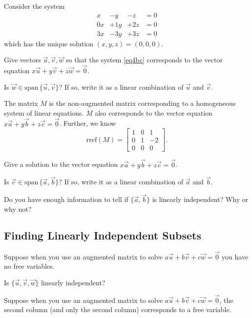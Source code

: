\documentclass[14pt]{problemset}
\newcommand{\Span}{\mathrm{span}\,}
\newcommand{\rref}{\mathrm{rref}}
\newcommand{\mat}[1]{\begin{bmatrix}#1\end{bmatrix}}
\begin{document}
	\question
	Consider the system 
		\begin{equation}\label{eq4bc}
			\begin{array}{llll}
				x&-y&-z &= 0\\
				0x&+1y&+2z &= 0\\
				3x&-3y&+3z &= 0
			\end{array}
		\end{equation}
	which has the unique solution $(x,y,z)=(0,0,0)$.
	\begin{parts}
		\item Give vectors $\vec u,\vec v,\vec w$ so that the system \eqref{eq4bc}
			corresponds to the vector equation $x\vec u+y\vec v+z\vec w = \vec 0$.
		\item Is $\vec w\in\Span\{\vec u,\vec v\}$? If so, write it as a linear combination
			of $\vec u$ and $\vec v$.
	\end{parts}

	\newpage
	\question
	The matrix $M$ is the non-augmented matrix corresponding to a homogeneous system of linear equations.
	$M$ also corresponds to the vector equation $x\vec a+y\vec b+z\vec c=\vec 0$.  Further, we know
	\[
		\rref(M) = \mat{1&0&1\\0&1&-2\\0&0&0}.
	\]
	\begin{parts}
		\item Give a solution to the vector equation $x\vec a+y\vec b+z\vec c=\vec 0$.
		\item Is $\vec c\in\Span\{\vec a,\vec b\}$?  If so, write it as a linear combination
			of $\vec a$ and $\vec b$.
		\item Do you have enough information to tell if $\{\vec a,\vec b\}$ is linearly independent?  Why or why not?
	\end{parts}

\subsection*{Finding Linearly Independent Subsets}
	\question
	Suppose when you use an augmented matrix to solve
	$a\vec u+b\vec v+c\vec w=\vec 0$ you have no free variables.
	
	\begin{parts}
		\item Is $\{\vec u,\vec v,\vec w\}$ linearly independent?
	\end{parts}
	
	Suppose when you use an augmented matrix to solve
	$a\vec u+b\vec v+c\vec w=\vec 0$, the second column (and only the second column) corresponds to a 
	free variable.
	
\end{document}
